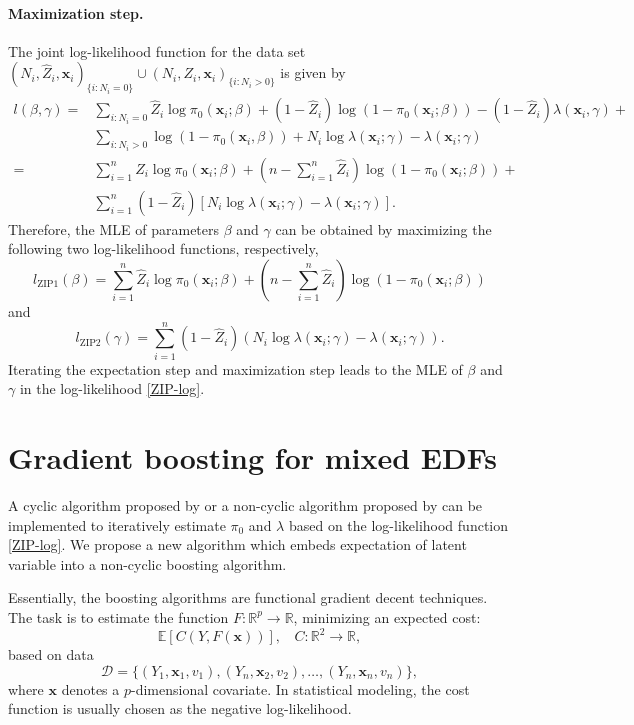 \documentclass[11pt]{article}
\numberwithin{equation}{section}
\def\R{{\mathbb R}}  %
\def\E{{\mathbb E}}  %
\def\bx{\boldsymbol{x}}
\begin{document}
\paragraph{Maximization step.}
The joint log-likelihood function for the data set $(N_i,\hat{Z}_i,\bx_i)_{\{i:N_i=0\}}\cup(N_i,Z_i,\bx_i)_{\{i:N_i>0\}}$ is given by
\begin{equation}
	\begin{aligned}
		l(\beta,\gamma)=&\sum_{i:N_i=0}\hat{Z}_i\log\pi_0(\bx_i;\beta)+(1-\hat{Z}_i)\log(1-\pi_0(\bx_i;\beta))-(1-\hat{Z}_i)\lambda(\bx_i,\gamma)+\\
		&\sum_{i:N_i>0}	\log(1-\pi_0(\bx_i,\beta))+N_i\log\lambda(\bx_i;\gamma)-\lambda(\bx_i;\gamma)\\
		=&\sum_{i=1}^n\hat{Z}_i\log\pi_0(\bx_i;\beta)+\left(n-\sum_{i=1}^n\hat{Z}_i\right)\log(1-\pi_0(\bx_i;\beta)) +\\
		& \sum_{i=1}^n(1-\hat{Z}_i)\left[N_i\log\lambda(\bx_i;\gamma)-\lambda(\bx_i;\gamma)\right].
	\end{aligned}
\end{equation}
Therefore, the MLE of parameters $\beta$ and $\gamma$ can be obtained by maximizing the following two log-likelihood functions, respectively,
\begin{equation}\label{ZIP1}
	l_\text{ZIP1}(\beta)=\sum_{i=1}^n\hat{Z}_i\log\pi_0(\bx_i;\beta)+\left(n-\sum_{i=1}^n\hat{Z}_i\right)\log(1-\pi_0(\bx_i;\beta))
\end{equation}
and 
\begin{equation}\label{ZIP2}
	l_\text{ZIP2}(\gamma)=\sum_{i=1}^n(1-\hat{Z}_i)\left(N_i\log\lambda(\bx_i;\gamma)-\lambda(\bx_i;\gamma)\right).
\end{equation}
Iterating the expectation step and maximization step leads to the MLE of $\beta$ and $\gamma$ in the log-likelihood \eqref{ZIP-log}.

\section{Gradient boosting for mixed EDFs}

A cyclic algorithm proposed by \cite{mayr:2012} or a non-cyclic algorithm proposed by \cite{thomas:2018} can be implemented to iteratively estimate $\pi_0$ and $\lambda$ based on the log-likelihood function \eqref{ZIP-log}. 
We propose a new algorithm which embeds expectation of latent variable into a non-cyclic boosting algorithm.

Essentially, the boosting algorithms are functional gradient decent techniques. The task is to estimate the function $F:\R^p\rightarrow\R$, minimizing an expected cost:
$$\E[C(Y,F(\bx))], ~~~~ C: \R^2\rightarrow\R,$$
based on data $$\mathcal{D}=\{(Y_1,\bx_1,v_1),(Y_n,\bx_2,v_2),\ldots,(Y_n,\bx_n,v_n)\},$$ where $\bx$ denotes a $p$-dimensional covariate. In statistical modeling, the cost function is usually chosen as the negative log-likelihood.
\end{document}
